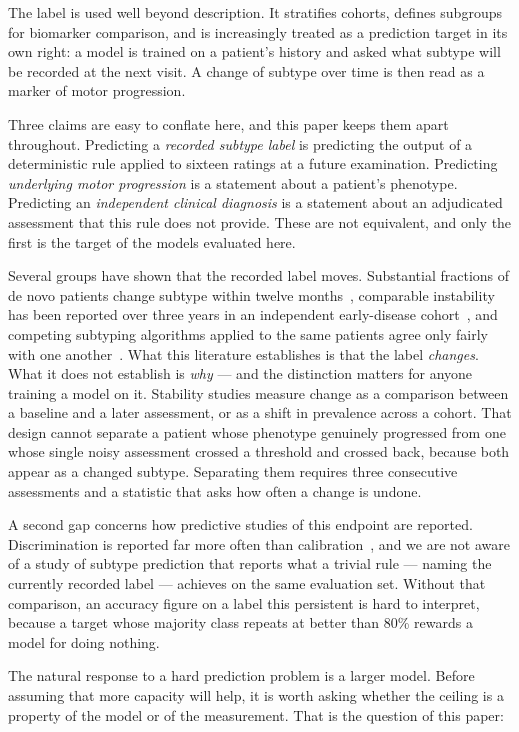 \documentclass[11pt]{article}
\begin{document}
The label is used well beyond description. It stratifies cohorts, defines
subgroups for biomarker comparison, and is increasingly treated as a prediction
target in its own right: a model is trained on a patient's history and asked
what subtype will be recorded at the next visit. A change of subtype over time
is then read as a marker of motor progression.

Three claims are easy to conflate here, and this paper keeps them apart
throughout. Predicting a \emph{recorded subtype label} is predicting the output
of a deterministic rule applied to sixteen ratings at a future examination.
Predicting \emph{underlying motor progression} is a statement about a patient's
phenotype. Predicting an \emph{independent clinical diagnosis} is a statement
about an adjudicated assessment that this rule does not provide. These are not
equivalent, and only the first is the target of the models evaluated here.

Several groups have shown that the recorded label moves. Substantial fractions
of de novo patients change subtype within twelve months~\citep{simuni2016},
comparable instability has been reported over three years in an independent
early-disease cohort~\citep{kohat2021}, and competing subtyping algorithms
applied to the same patients agree only fairly with one
another~\citep{ren2020,ren2021}. What this literature establishes is that the
label \emph{changes}. What it does not establish is \emph{why} --- and the
distinction matters for anyone training a model on it. Stability studies measure
change as a comparison between a baseline and a later assessment, or as a shift
in prevalence across a cohort. That design cannot separate a patient whose
phenotype genuinely progressed from one whose single noisy assessment crossed a
threshold and crossed back, because both appear as a changed subtype. Separating
them requires three consecutive assessments and a statistic that asks how often
a change is undone.

A second gap concerns how predictive studies of this endpoint are reported.
Discrimination is reported far more often than
calibration~\citep{vancalster2019}, and we are not aware of a study of subtype
prediction that reports what a trivial rule --- naming the currently recorded
label --- achieves on the same evaluation set. Without that comparison, an
accuracy figure on a label this persistent is hard to interpret, because a
target whose majority class repeats at better than 80\% rewards a model for
doing nothing.

The natural response to a hard prediction problem is a larger model. Before
assuming that more capacity will help, it is worth asking whether the ceiling is
a property of the model or of the measurement. That is the question of this
paper:
\end{document}
